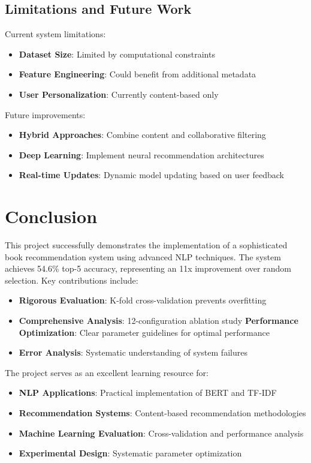 \documentclass[12pt,a4paper]{article}
\begin{document}
\subsection{Limitations and Future Work}
Current system limitations:
\begin{itemize}
    \item \textbf{Dataset Size}: Limited by computational constraints
    \item \textbf{Feature Engineering}: Could benefit from additional metadata
    \item \textbf{User Personalization}: Currently content-based only
\end{itemize}

Future improvements:
\begin{itemize}
    \item \textbf{Hybrid Approaches}: Combine content and collaborative filtering
    \item \textbf{Deep Learning}: Implement neural recommendation architectures
    \item \textbf{Real-time Updates}: Dynamic model updating based on user feedback
\end{itemize}

\section{Conclusion}

This project successfully demonstrates the implementation of a sophisticated book recommendation system using advanced NLP techniques. The system achieves 54.6\% top-5 accuracy, representing an 11x improvement over random selection. Key contributions include:

\begin{itemize}
    \item \textbf{Rigorous Evaluation}: K-fold cross-validation prevents overfitting
    \item \textbf{Comprehensive Analysis}: 12-configuration ablation study
    \textbf{Performance Optimization}: Clear parameter guidelines for optimal performance
    \item \textbf{Error Analysis}: Systematic understanding of system failures
\end{itemize}

The project serves as an excellent learning resource for:
\begin{itemize}
    \item \textbf{NLP Applications}: Practical implementation of BERT and TF-IDF
    \item \textbf{Recommendation Systems}: Content-based recommendation methodologies
    \item \textbf{Machine Learning Evaluation}: Cross-validation and performance analysis
    \item \textbf{Experimental Design}: Systematic parameter optimization
\end{itemize}
\end{document}
